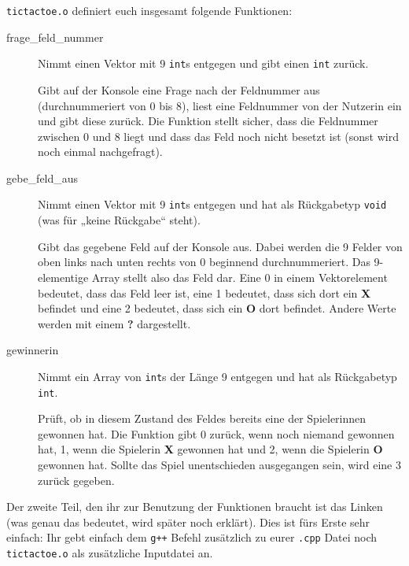 \texttt{tictactoe.o} definiert euch insgesamt folgende Funktionen:
\begin{description}
	\item[frage\_feld\_nummer]
		Nimmt einen Vektor mit 9 \texttt{int}s entgegen und gibt einen \texttt{int} zurück.

		Gibt auf der Konsole eine Frage nach der Feldnummer aus (durchnummeriert von 0 bis 8), liest eine Feldnummer von der Nutzerin ein und gibt diese zurück.
		Die Funktion stellt sicher, dass die Feldnummer zwischen 0 und 8 liegt und dass das Feld noch nicht besetzt ist (sonst wird noch einmal nachgefragt).
	\item[gebe\_feld\_aus]
		Nimmt einen Vektor mit 9 \texttt{int}s entgegen und hat als Rückgabetyp \texttt{void} (was für „keine Rückgabe“ steht).

		Gibt das gegebene Feld auf der Konsole aus. Dabei werden die 9 Felder von oben links nach unten rechts von 0 beginnend durchnummeriert.
		Das 9-elementige Array stellt also das Feld dar.
		Eine 0 in einem Vektorelement bedeutet, dass das Feld leer ist, eine 1 bedeutet, dass sich dort ein \textbf{X} befindet und eine 2 bedeutet, dass sich ein \textbf{O} dort befindet.
		Andere Werte werden mit einem \textbf{?} dargestellt.
	\item[gewinnerin]
		Nimmt ein Array von \texttt{int}s der Länge 9 entgegen und hat als Rückgabetyp \texttt{int}.

		Prüft, ob in diesem Zustand des Feldes bereits eine der Spielerinnen gewonnen hat.
		Die Funktion gibt 0 zurück, wenn noch niemand gewonnen hat, 1, wenn die Spielerin \textbf{X} gewonnen hat und 2, wenn die Spielerin \textbf{O} gewonnen hat.
		Sollte das Spiel unentschieden ausgegangen sein, wird eine 3 zurück gegeben.
\end{description}

Der zweite Teil, den ihr zur Benutzung der Funktionen braucht ist das Linken (was genau das bedeutet, wird später noch erklärt).
Dies ist fürs Erste sehr einfach: Ihr gebt einfach dem \texttt{g++} Befehl zusätzlich zu eurer \texttt{.cpp} Datei noch \texttt{tictactoe.o} als zusätzliche Inputdatei an.


